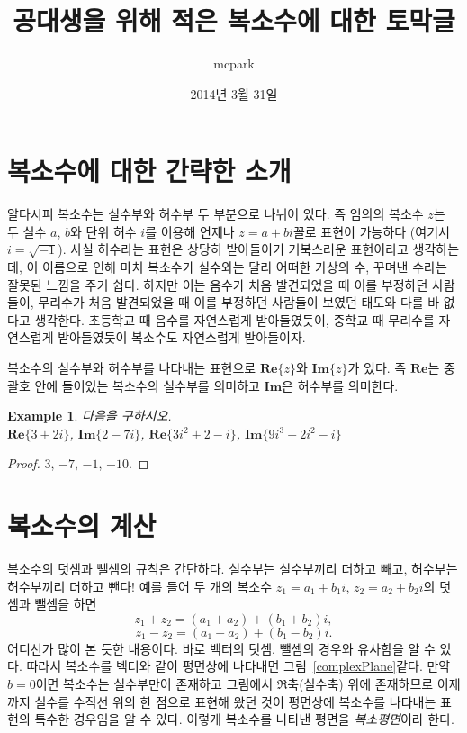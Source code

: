 \documentclass[a4paper, nobookmarks, subfigure, adjustmath, amsmath]{oblivoir}
\title{공대생을 위해 적은 복소수에 대한 토막글}
\author{mcpark}
\date{2014년 3월 31일}
\newcommand{\myemph}{\emph}
\newcommand{\myfig}{그림~}
\newtheorem{example}{Example}
\begin{document}
\maketitle

\section{복소수에 대한 간략한 소개}

알다시피 복소수는 실수부와 허수부 두 부분으로 나뉘어 있다. 즉 임의의 복소수 $z$는 두 실수 $a$, $b$와 단위 허수 $i$를 이용해 언제나 $z = a+bi$꼴로 표현이 가능하다 (여기서 $i = \sqrt{-1}$). 사실 허수라는 표현은 상당히 받아들이기 거북스러운 표현이라고 생각하는데, 이 이름으로 인해 마치 복소수가 실수와는 달리 어떠한 가상의 수, 꾸며낸 수라는 잘못된 느낌을 주기 쉽다. 하지만 이는 음수가 처음 발견되었을 때 이를 부정하던 사람들이, 무리수가 처음 발견되었을 때 이를 부정하던 사람들이 보였던 태도와 다를 바 없다고 생각한다. 초등학교 때 음수를 자연스럽게 받아들였듯이, 중학교 때 무리수를 자연스럽게 받아들였듯이 복소수도 자연스럽게 받아들이자.


복소수의 실수부와 허수부를 나타내는 표현으로 $\mathbf{Re}\{z\}$와 $\mathbf{Im}\{z\}$가 있다. 즉 $\mathbf{Re}$는 중괄호 안에 들어있는 복소수의 실수부를 의미하고 $\mathbf{Im}$은 허수부를 의미한다.

\begin{example}
다음을 구하시오.\\
$\mathbf{Re}\{3+2i\}$, $\mathbf{Im}\{2-7i\}$, $\mathbf{Re}\{3i^2 + 2 - i\}$, $\mathbf{Im}\{9i^3 + 2i^2 - i\}$
\end{example}

\begin{proof}
3, $-7$, $-1$, $-10$.
\end{proof}


\section{복소수의 계산}
복소수의 덧셈과 뺄셈의 규칙은 간단하다. 실수부는 실수부끼리 더하고 빼고, 허수부는 허수부끼리 더하고 뺀다! 예를 들어 두 개의 복소수 $z_1 = a_1 + b_1i$, $z_2 = a_2 + b_2i$의 덧셈과 뺄셈을 하면
\begin{equation}
z_1+z_2 = (a_1+a_2)+(b_1+b_2)i,
\end{equation}
\begin{equation}
z_1-z_2 = (a_1-a_2)+(b_1-b_2)i.
\end{equation}
어디선가 많이 본 듯한 내용이다. 바로 벡터의 덧셈, 뺄셈의 경우와 유사함을 알 수 있다. 따라서 복소수를 벡터와 같이 평면상에 나타내면 \myfig\ref{complexPlane}\과 같다. 만약 $b = 0$이면 복소수는 실수부만이 존재하고 그림에서 $\Re$축(실수축) 위에 존재하므로 이제까지 실수를 수직선 위의 한 점으로 표현해 왔던 것이 평면상에 복소수를 나타내는 표현의 특수한 경우임을 알 수 있다. 이렇게 복소수를 나타낸 평면을 \myemph{복소평면}이라 한다.
\end{document}
